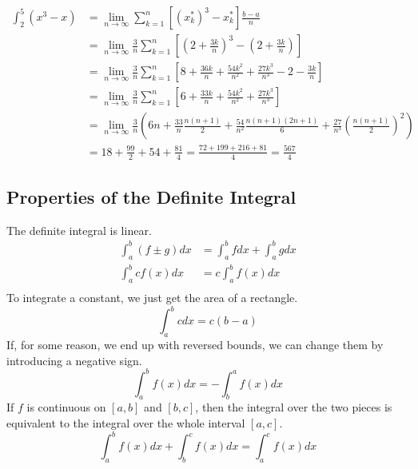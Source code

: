 \documentclass[fleqn]{report}
\begin{document}
\begin{example}
\begin{align*}
\int_2^5 (x^3-x) 
& = \lim_{n \rightarrow \infty} \sum_{k=1}^n \left[ (x^*_k)^3 -
x^*_k \right] \frac{b-a}{n} \\
& = \lim_{n \rightarrow \infty} \frac{3}{n} \sum_{k=1}^n \left[
\left(2 + \frac{3k}{n} \right)^3 - \left(2+ \frac{3k}{n}
\right) \right] \\
& = \lim_{n \rightarrow \infty} \frac{3}{n} \sum_{k=1}^n \left[
8 + \frac{36k}{n} + \frac{54k^2}{n^2} + \frac{27k^3}{n^3} - 2 -
\frac{3k}{n} \right] \\
& = \lim_{n \rightarrow \infty} \frac{3}{n} \sum_{k=1}^n \left[
6 + \frac{33k}{n} + \frac{54k^2}{n^2} + \frac{27k^3}{n^3} \right] \\
& = \lim_{n \rightarrow \infty} \frac{3}{n} \left( 6n +
\frac{33}{n} \frac{n(n+1)}{2} + \frac{54}{n^2}
\frac{n(n+1)(2n+1)}{6} + \frac{27}{n^3} \left( \frac{n(n+1)}{2}
\right)^2 \right) \\
& = 18 + \frac{99}{2} + 54 + \frac{81}{4} = \frac{72+ 199+ 216+
81}{4} = \frac{567}{4}
\end{align*}
\end{example}

\subsection{Properties of the Definite Integral}
\label{integral-properties}

The definite integral is linear.
\begin{align*} 
\int_a^b (f \pm g) dx & = \int_a^b f dx + \int_a^b g dx \\
\int_a^b c f(x) dx & = c \int_a^b f(x) dx \\
\end{align*}
To integrate a constant, we just get the area of a rectangle.
\begin{equation*}
\int_a^b c dx = c(b-a)
\end{equation*}
If, for some reason, we end up with reversed bounds, we can
change them by introducing a negative sign.
\begin{equation*}
\int_a^b f(x) dx = - \int_b^a f(x) dx 
\end{equation*}
If $f$ is continuous on $[a,b]$ and $[b,c]$, then the integral
over the two pieces is equivalent to the integral over the
whole interval $[a,c]$.
\begin{equation*} 
\int_a^bf(x) dx + \int_b^c f(x) dx = \int_a^c f(x) dx 
\end{equation*}
\end{document}
